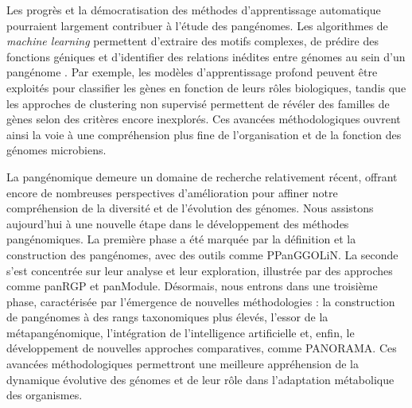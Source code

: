 Les progrès et la démocratisation des méthodes d’apprentissage automatique pourraient largement contribuer à l’étude des pangénomes. Les algorithmes de \textit{machine learning} permettent d’extraire des motifs complexes, de prédire des fonctions géniques et d’identifier des relations inédites entre génomes au sein d’un pangénome \cite{kavvas_machine_2018}. Par exemple, les modèles d’apprentissage profond peuvent être exploités pour classifier les gènes en fonction de leurs rôles biologiques, tandis que les approches de clustering non supervisé permettent de révéler des familles de gènes selon des critères encore inexplorés. Ces avancées méthodologiques ouvrent ainsi la voie à une compréhension plus fine de l’organisation et de la fonction des génomes microbiens.

\newpage

La pangénomique demeure un domaine de recherche relativement récent, offrant encore de nombreuses perspectives d’amélioration pour affiner notre compréhension de la diversité et de l’évolution des génomes. Nous assistons aujourd’hui à une nouvelle étape dans le développement des méthodes pangénomiques.
La première phase a été marquée par la définition et la construction des pangénomes, avec des outils comme PPanGGOLiN. La seconde s’est concentrée sur leur analyse et leur exploration, illustrée par des approches comme panRGP et panModule. Désormais, nous entrons dans une troisième phase, caractérisée par l’émergence de nouvelles méthodologies : la construction de pangénomes à des rangs taxonomiques plus élevés, l’essor de la métapangénomique, l’intégration de l’intelligence artificielle et, enfin, le développement de nouvelles approches comparatives, comme PANORAMA.
Ces avancées méthodologiques permettront une meilleure appréhension de la dynamique évolutive des génomes et de leur rôle dans l’adaptation métabolique des organismes.
